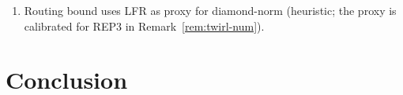\documentclass[11pt,a4paper]{article}
\begin{document}
\begin{enumerate}[leftmargin=1.4em]
    owing to native-noise rescue events. Corollary~\ref{cor:css} covers general CSS memories under
    the spacetime fault model with exact minimum-weight decoding
    (Remark~\ref{rem:decoder-inst} delineates which conclusions
    implemented decoders inherit); a
    circuit-level spacetime-distance proof for BB memories with hook
    errors (beyond the certified single-round $t=2$) is open. The
    repetition-code campaigns
    validate the bound structure and the calibration-to-model
    methodology; quantitative transfer of REP-calibrated noise models
    to BB-hardware performance predictions is not claimed and would
    require a separate BB-device modelling argument.
  \item Routing bound uses LFR as proxy for diamond-norm (heuristic;
    the proxy is calibrated for REP3 in Remark~\ref{rem:twirl-num}).
\end{enumerate}

\section{Conclusion}
\end{document}
